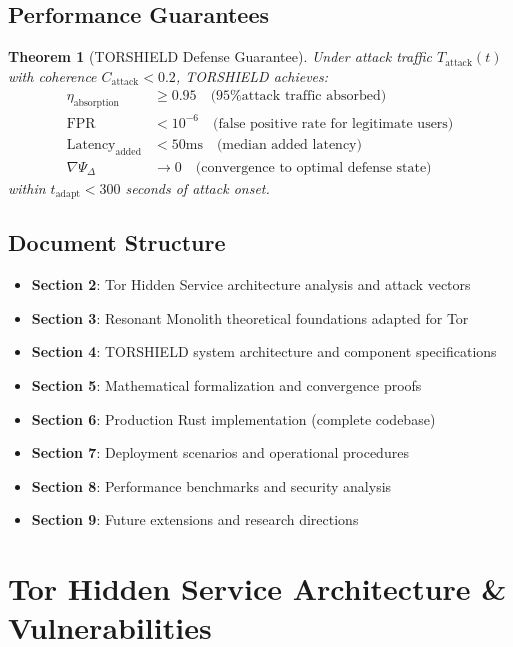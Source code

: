 \documentclass[11pt,a4paper]{article}
\newtheorem{theorem}{Theorem}[section]
\begin{document}
\subsection{Performance Guarantees}

\begin{theorem}[TORSHIELD Defense Guarantee]
Under attack traffic $T_{\text{attack}}(t)$ with coherence $C_{\text{attack}} < 0.2$, TORSHIELD achieves:
\begin{align}
\eta_{\text{absorption}} &\geq 0.95 \quad \text{(95\% attack traffic absorbed)} \\
\text{FPR} &< 10^{-6} \quad \text{(false positive rate for legitimate users)} \\
\text{Latency}_{\text{added}} &< 50\text{ms} \quad \text{(median added latency)} \\
\nabla\Psi_\Delta &\to 0 \quad \text{(convergence to optimal defense state)}
\end{align}
within $t_{\text{adapt}} < 300$ seconds of attack onset.
\end{theorem}

\subsection{Document Structure}

\begin{itemize}
\item \textbf{Section 2}: Tor Hidden Service architecture analysis and attack vectors
\item \textbf{Section 3}: Resonant Monolith theoretical foundations adapted for Tor
\item \textbf{Section 4}: TORSHIELD system architecture and component specifications
\item \textbf{Section 5}: Mathematical formalization and convergence proofs
\item \textbf{Section 6}: Production Rust implementation (complete codebase)
\item \textbf{Section 7}: Deployment scenarios and operational procedures
\item \textbf{Section 8}: Performance benchmarks and security analysis
\item \textbf{Section 9}: Future extensions and research directions
\end{itemize}

\newpage
\section{Tor Hidden Service Architecture \& Vulnerabilities}
\end{document}
